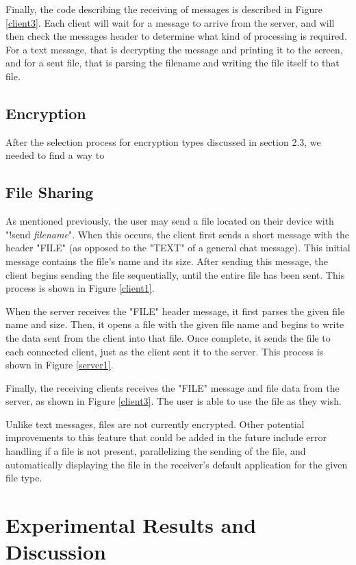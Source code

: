 \documentclass{article}
\begin{document}
Finally, the code describing the receiving of messages is described in Figure \ref{client3}. Each client will wait for a message to arrive from the server, and will then check the messages header to determine what kind of processing is required. For a text message, that is decrypting the message and printing it to the screen, and for a sent file, that is parsing the filename and writing the file itself to that file.

\subsection{Encryption}

After the selection process for encryption types discussed in section 2.3, we needed to find a way to  

\subsection{File Sharing}

As mentioned previously, the user may send a file located on their device with "!send \emph{filename}". When this occurs, the client first sends a short message with the header "FILE" (as opposed to the "TEXT" of a general chat message). This initial message contains the file's name and its size. After sending this message, the client begins sending the file sequentially, until the entire file has been sent. This process is shown in Figure \ref{client1}.

When the server receives the "FILE" header message, it first parses the given file name and size. Then, it opens a file with the given file name and begins to write the data sent from the client into that file. Once complete, it sends the file to each connected client, just as the client sent it to the server. This process is shown in Figure \ref{server1}.

Finally, the receiving clients receives the "FILE" message and file data from the server, as shown in Figure \ref{client3}. The user is able to use the file as they wish.

Unlike text messages, files are not currently encrypted. Other potential improvements to this feature that could be added in the future include error handling if a file is not present, parallelizing the sending of the file, and automatically displaying the file in the receiver's default application for the given file type.

\section{Experimental Results and Discussion}
\end{document}
